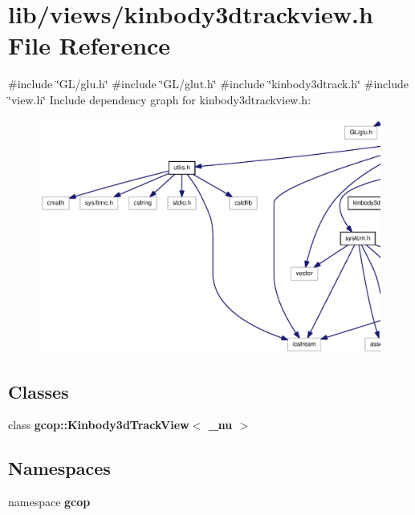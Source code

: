 \section{lib/views/kinbody3dtrackview.h \-File \-Reference}
\label{kinbody3dtrackview_8h}
{\ttfamily \#include \char`\"{}\-G\-L/glu.\-h\char`\"{}}\*
{\ttfamily \#include \char`\"{}\-G\-L/glut.\-h\char`\"{}}\*
{\ttfamily \#include \char`\"{}kinbody3dtrack.\-h\char`\"{}}\*
{\ttfamily \#include \char`\"{}view.\-h\char`\"{}}\*
\-Include dependency graph for kinbody3dtrackview.\-h\-:\nopagebreak
\begin{figure}[H]
\begin{center}
\leavevmode
\includegraphics[width=350pt]{kinbody3dtrackview_8h__incl}
\end{center}
\end{figure}
\subsection*{\-Classes}
\begin{DoxyCompactItemize}
\item 
class {\bf gcop\-::\-Kinbody3d\-Track\-View$<$ \-\_\-nu $>$}
\end{DoxyCompactItemize}
\subsection*{\-Namespaces}
\begin{DoxyCompactItemize}
\item 
namespace {\bf gcop}
\end{DoxyCompactItemize}
